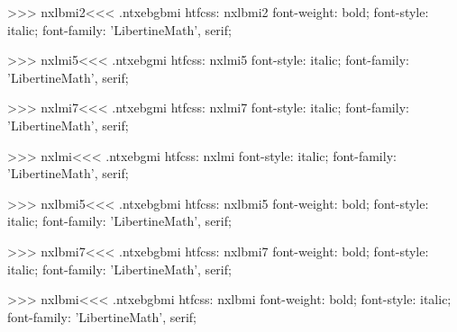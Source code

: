 >>>
\<nxlbmi2\><<<
.ntxebgbmi
htfcss:  nxlbmi2  font-weight: bold; font-style: italic; font-family: 'LibertineMath', serif;

>>>
\<nxlmi5\><<<
.ntxebgmi
htfcss:  nxlmi5  font-style: italic; font-family: 'LibertineMath', serif;

>>>
\<nxlmi7\><<<
.ntxebgmi
htfcss:  nxlmi7  font-style: italic; font-family: 'LibertineMath', serif;

>>>
\<nxlmi\><<<
.ntxebgmi
htfcss:  nxlmi  font-style: italic; font-family: 'LibertineMath', serif;

>>>
\<nxlbmi5\><<<
.ntxebgbmi
htfcss:  nxlbmi5  font-weight: bold; font-style: italic; font-family: 'LibertineMath', serif;

>>>
\<nxlbmi7\><<<
.ntxebgbmi
htfcss:  nxlbmi7  font-weight: bold; font-style: italic; font-family: 'LibertineMath', serif;

>>>
\<nxlbmi\><<<
.ntxebgbmi
htfcss:  nxlbmi  font-weight: bold; font-style: italic; font-family: 'LibertineMath', serif;

